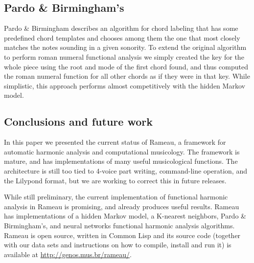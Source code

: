 \documentclass[a0paper]{sciposter}
\begin{document}
\begin{multicols}{3}
\subsection{Pardo \& Birmingham's}
\label{sec:pardo--birminghams}

Pardo \& Birmingham \cite{pardo.ea99:automated} describes an algorithm
for chord labeling that has some predefined chord templates and
chooses among them the one that most closely matches the notes
sounding in a given sonority. To extend the original algorithm to
perform roman numeral functional analysis we simply created the key
for the whole piece using the root and mode of the first chord found,
and thus computed the roman numeral function for all other chords as
if they were in that key. While simplistic, this approach performs
almost competitively with the hidden Markov model.

\end{multicols}

\begin{center}
\begin{multicols}{2}


\end{multicols}
\end{center}


\begin{multicols}{3}

\section{Conclusions and future work}
\label{sec:concl-future-work}

In this paper we presented the current status of Rameau, a framework
for automatic harmonic analysis and computational musicology. The
framework is mature, and has implementations of many useful
musicological functions. The architecture is still too tied to 4-voice
part writing, command-line operation, and the Lilypond format, but we
are working to correct this in future releases.

While still preliminary, the current implementation of functional
harmonic analysis in Rameau is promising, and already produces useful
results. Rameau has implementations of a hidden Markov model, a
K-nearest neighbors, Pardo \& Birmingham's, and neural networks
functional harmonic analysis algorithms. Rameau is open source,
written in Common Lisp and its source code (together with our data
sets and instructions on how to compile, install and run it) is
available at \url{http://genos.mus.br/rameau/}.

\renewcommand{\refname}{References}



\end{multicols}
\end{document}

